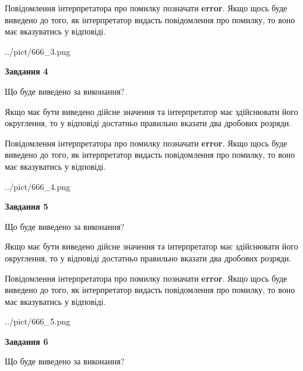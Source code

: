 \documentclass[12pt, ukrainian]{article}
\begin{document}
{\begin {Large}
Повідомлення інтерпретатора про помилку позначати \textbf{error}.
Якщо щось буде виведено до того, як інтерпретатор видасть повідомлення про помилку, 
то воно має вказуватись у відповіді. \par

\begin{center}
	{../pict/666_3.png}
\end{center}
\newpage

{\begin {center}\textbf{Завдання 4}\end {center}}\par
Що буде виведено за виконання? \par

Якщо має бути виведено дійсне значення та інтерпретатор має здійснювати його округлення, 
то у відповіді достатньо правильно вказати два дробових розряди.

Повідомлення інтерпретатора про помилку позначати \textbf{error}.
Якщо щось буде виведено до того, як інтерпретатор видасть повідомлення про помилку, 
то воно має вказуватись у відповіді. \par

\begin{center}
	{../pict/666_4.png}
\end{center}
\newpage

{\begin {center}\textbf{Завдання 5}\end {center}}\par
Що буде виведено за виконання? \par

Якщо має бути виведено дійсне значення та інтерпретатор має здійснювати його округлення, 
то у відповіді достатньо правильно вказати два дробових розряди.

Повідомлення інтерпретатора про помилку позначати \textbf{error}.
Якщо щось буде виведено до того, як інтерпретатор видасть повідомлення про помилку, 
то воно має вказуватись у відповіді. \par

\begin{center}
	{../pict/666_5.png}
\end{center}
\newpage

{\begin {center}\textbf{Завдання 6}\end {center}}\par
Що буде виведено за виконання? \par


\end{Large}}
\end{document}
